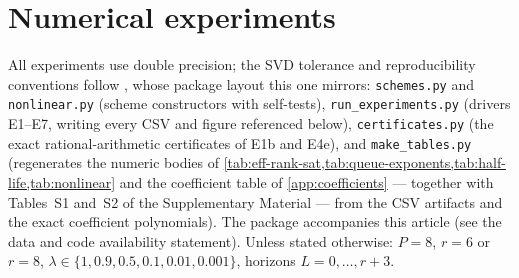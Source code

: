 \documentclass[pdflatex,sn-mathphys-num]{sn-jnl}%
\theoremstyle{thmstyleone}%
\theoremstyle{thmstyletwo}%
\theoremstyle{thmstylethree}%
\begin{document}
\section{Numerical experiments}\label{sec:num_exp}

All experiments use double precision; the SVD tolerance and reproducibility conventions follow \cite{PolemitisChristakisDrikakis2026FVerasure}, whose package layout this one mirrors: \texttt{schemes.py} and \texttt{nonlinear.py} (scheme constructors with self-tests), \texttt{run\_experiments.py} (drivers E1--E7, writing every CSV and figure referenced below), \texttt{certificates.py} (the exact rational-arithmetic certificates of E1b and E4e), and \texttt{make\_tables.py} (regenerates the numeric bodies of \cref{tab:eff-rank-sat,tab:queue-exponents,tab:half-life,tab:nonlinear} and the coefficient table of \cref{app:coefficients} --- together with Tables~S1 and~S2 of the Supplementary Material --- from the CSV artifacts and the exact coefficient polynomials).
The package accompanies this article (see the data and code availability statement).
Unless stated otherwise: $P=8$, $r=6$ or $r=8$, $\lambda\in\{1,0.9,0.5,0.1,0.01,0.001\}$, horizons $L=0,\ldots,r+3$.
\end{document}
